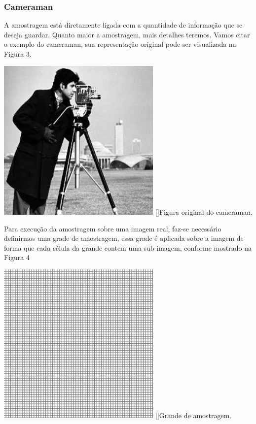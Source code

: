\documentclass[a4paper,11pt]{article}
\newenvironment{Figure}
  {\par\medskip\noindent\minipage{\linewidth}}
    {\endminipage\par\medskip}
\begin{document}
\begin{multicols}{2}
\subsubsection{Cameraman}
A amostragem está diretamente ligada com a quantidade de informação que se deseja guardar. Quanto maior a amostragem, mais detalhes teremos.
Vamos citar o exemplo do cameraman, sua representação original pode ser visualizada na Figura 3.
\begin{Figure}
	\centering 
	\includegraphics[width=8cm, height=8cm]{figura3}
	[]{Figura original do cameraman.}
	\label{medium}
\end{Figure}
Para execução da amostragem sobre uma imagem real, faz-se necessário definirmos uma grade de amostragem, essa grade é aplicada sobre a imagem de forma que cada célula da grande contem uma sub-imagem, conforme mostrado na Figura 4
\begin{Figure}
	\centering 
	\includegraphics[width=8cm, height=8cm]{figura4}
	[]{Grande de amostragem.}
	\label{medium}
\end{Figure}

\end{multicols}
\end{document}
